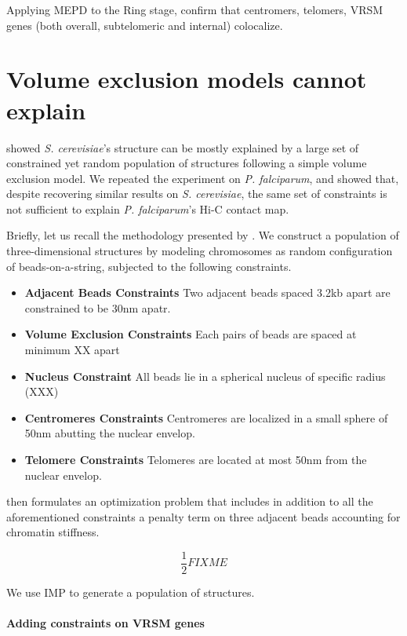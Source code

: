 \documentclass[letterpaper,12pt]{article}
\begin{document}
Applying MEPD to the Ring stage, \citet{capurso:distance-based} confirm that
centromers, telomers, VRSM genes (both overall, subtelomeric and internal)
colocalize.

\section{Volume exclusion models cannot explain }

\citet{tjong:physical} showed \textit{S. cerevisiae}'s structure can be mostly
explained by a large set of constrained yet random population of structures
following a simple volume exclusion model. We repeated the experiment on {\em
P. falciparum}, and showed that, despite recovering similar results on {\em S.
cerevisiae}, the same set of constraints is not sufficient to explain {\em P.
falciparum}'s Hi-C contact map. 

Briefly, let us recall the methodology presented by \citet{tjong:physical}. We
construct a population of three-dimensional structures by modeling chromosomes
as random configuration of beads-on-a-string, subjected to the following constraints.

\begin{itemize}
\item \textbf{Adjacent Beads Constraints} Two adjacent beads spaced 3.2kb apart are constrained to be 30nm apatr.
\item \textbf{Volume Exclusion Constraints} Each pairs of beads are spaced at minimum XX apart
\item \textbf{Nucleus Constraint} All beads lie in a spherical nucleus of specific
radius (XXX)
\item \textbf{Centromeres Constraints} Centromeres are localized in a small sphere of
50nm abutting the nuclear envelop.
\item \textbf{Telomere Constraints} Telomeres are located at most 50nm from the nuclear envelop.
\end{itemize}

\citet{tjong:physical} then formulates an optimization problem that includes
in addition to all the aforementioned constraints a penalty term on three
adjacent beads accounting for chromatin stiffness.

$$
\frac{1}{2} FIXME
$$

We use IMP to generate a population of structures.

\paragraph{Adding constraints on VRSM genes}
\end{document}
